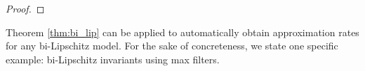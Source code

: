 \documentclass[twoside,11pt]{article}
\begin{document}
\begin{proof}
\end{proof}

Theorem \ref{thm:bi_lip} can be applied to automatically  obtain approximation rates for any bi-Lipschitz model. For the sake of concreteness, we state one specific example: bi-Lipschitz invariants using max filters. 
\end{document}
